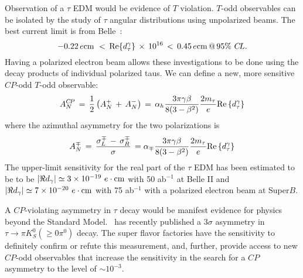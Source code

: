 Observation of a $\tau$ EDM would be evidence of $T$ violation.  $T$-odd observables can be isolated by the study of $\tau$ angular
distributions using unpolarized beams. The best current limit is from Belle~\cite{bellemom}:
\vskip -12pt
\[ - 0.22\,e{\rm{cm}}\,\, < \,{\mathop{\rm Re}\nolimits} \{ d_\tau ^\gamma \} \, \times \,{10^{16}}\, < \,0.45\,e{\rm{cm}}\,@\,95\% \,\,C\!L.\]
\vskip -8pt
Having a polarized electron
beam allows these investigations to be done using the decay products
of individual polarized taus. We can define a new, more sensitive $C\!P$-odd $T$-odd observable:
\vskip -12pt
\[A_N^{C\!P}\, = \,\frac{1}{2}\left( {A_N^ + \, + \,A_N^ - } \right)\, = \,{\alpha _h}\frac{{3\pi \gamma \beta }}{{8(3 - {\beta ^2})}}\frac{{2{m_\tau }}}{e}{\mathop{\rm Re}\nolimits} \left\{ {d_\tau ^\gamma } \right\}\]
where the azimuthal asymmetry for the two polarizations is 
\[A_N^ \mp \, = \,\frac{{\sigma _L^ \mp \, - \,\sigma _R^ \mp }}{\sigma }\, = {\alpha _ \mp }\frac{{3\pi \gamma \beta }}{{8(3 - {\beta ^2})}}\frac{{2{m_\tau }}}{e}{\mathop{\rm Re}\nolimits} \left\{ {d_\tau ^\gamma } \right\}\]
\vskip -12pt
The upper-limit sensitivity for the real part of the
$\tau$ EDM has been estimated to be to be $|\Re{d_\gamma}|\simeq 3\times 10^{-19} \ e \cdot {\rm cm}$
with 50 ab$^{-1 }$ at Belle II and $|\Re{d_\gamma}|\simeq 7\times 10^{-20} \ e \cdot {\rm cm}$
with 75 ab$^{-1 }$ with a polarized electron beam at Super$B$\cite{GonzalezSprinberg:2000mk}.

A $C\!P$-violating asymmetry in $\tau$ decay would be manifest evidence
for physics beyond the Standard Model. \babar\ has recently published
a 3$\sigma$ asymmetry in $\tau\to\pi K_S^0(\ge 0\pi^0)$
decay\cite{BABAR:2011aa}. The super flavor factories have the sensitivity to
definitely confirm or refute this measurement, and, further, provide
access to new $C\!P$-odd observables that increase the sensitivity in the
search for a $C\!P$ asymmetry to the level of $\sim 10^{-3}$.
